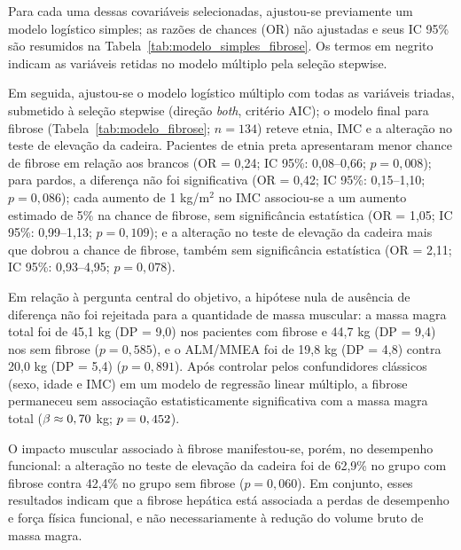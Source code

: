 \documentclass[11pt,a4paper]{article}
\begin{document}


Para cada uma dessas covariáveis selecionadas, ajustou-se previamente um modelo
logístico simples; as razões de chances (OR) não ajustadas e seus IC 95\% são
resumidos na Tabela~\ref{tab:modelo_simples_fibrose}. Os termos em negrito
indicam as variáveis retidas no modelo múltiplo pela seleção stepwise.

\begin{table}[H]
  \centering
  \caption{Modelos logísticos simples para fibrose hepática.}
  \label{tab:modelo_simples_fibrose}
  
\end{table}

Em seguida, ajustou-se o modelo logístico múltiplo com todas as variáveis
triadas, submetido à seleção stepwise (direção \textit{both}, critério AIC);
o modelo final para fibrose
(Tabela~\ref{tab:modelo_fibrose}; $n = 134$) reteve etnia, IMC e a alteração no
teste de elevação da cadeira.
Pacientes de etnia preta apresentaram menor chance de fibrose em relação aos
brancos (OR = 0,24; IC 95\%: 0,08--0,66; $p = 0{,}008$); para pardos, a diferença
não foi significativa (OR = 0,42; IC 95\%: 0,15--1,10; $p = 0{,}086$); cada
aumento de 1 kg/m$^2$ no IMC associou-se a um aumento estimado de 5\% na chance
de fibrose, sem significância estatística (OR = 1,05; IC 95\%: 0,99--1,13;
$p = 0{,}109$); e a alteração no teste de elevação da cadeira mais que dobrou a
chance de fibrose, também sem significância estatística (OR = 2,11;
IC 95\%: 0,93--4,95; $p = 0{,}078$).

Em relação à pergunta central do objetivo, a hipótese nula de ausência de
diferença não foi rejeitada para a quantidade de massa muscular: a massa magra
total foi de 45,1 kg (DP = 9,0) nos pacientes com fibrose e 44,7 kg (DP = 9,4)
nos sem fibrose ($p = 0{,}585$), e o ALM/MMEA foi de 19,8 kg (DP = 4,8) contra
20,0 kg (DP = 5,4) ($p = 0{,}891$). Após controlar pelos confundidores clássicos
(sexo, idade e IMC) em um modelo de regressão linear múltiplo, a fibrose
permaneceu sem associação estatisticamente significativa com a massa magra
total ($\beta \approx 0,70{}$ kg; $p = 0,452{}$).

O impacto muscular associado à fibrose manifestou-se, porém, no desempenho
funcional: a alteração no teste de elevação da cadeira foi de 62,9\% no grupo
com fibrose contra 42,4\% no grupo sem fibrose ($p = 0{,}060$). Em conjunto,
esses resultados indicam que a fibrose hepática está associada a perdas de
desempenho e força física funcional, e não necessariamente à redução do volume
bruto de massa magra.
\end{document}
